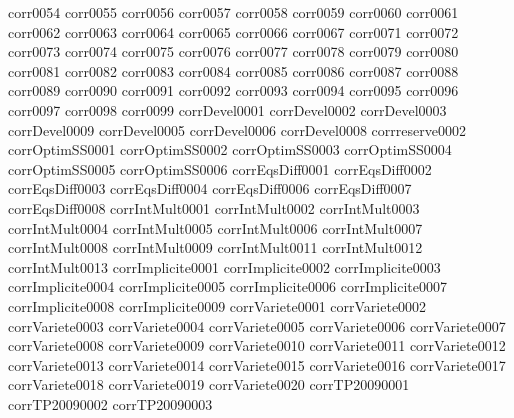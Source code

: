 {corr0054}
{corr0055}
{corr0056}
{corr0057}
{corr0058}
{corr0059}
{corr0060}
{corr0061}
{corr0062}
{corr0063}
{corr0064}
{corr0065}
{corr0066}
{corr0067}
{corr0071}
{corr0072}
{corr0073}
{corr0074}
{corr0075}
{corr0076}
{corr0077}
{corr0078}
{corr0079}
{corr0080}
{corr0081}
{corr0082}
{corr0083}
{corr0084}
{corr0085}
{corr0086}
{corr0087}
{corr0088}
{corr0089}
{corr0090}
{corr0091}
{corr0092}
{corr0093}
{corr0094}
{corr0095}
{corr0096}
{corr0097}
{corr0098}
{corr0099}
{corrDevel0001}
{corrDevel0002}
{corrDevel0003}
{corrDevel0009}
{corrDevel0005}
{corrDevel0006}
{corrDevel0008}
{corrreserve0002}
{corrOptimSS0001}
{corrOptimSS0002}
{corrOptimSS0003}
{corrOptimSS0004}
{corrOptimSS0005}
{corrOptimSS0006}
{corrEqsDiff0001}
{corrEqsDiff0002}
{corrEqsDiff0003}
{corrEqsDiff0004}
{corrEqsDiff0006}
{corrEqsDiff0007}
{corrEqsDiff0008}
{corrIntMult0001}
{corrIntMult0002}
{corrIntMult0003}
{corrIntMult0004}
{corrIntMult0005}
{corrIntMult0006}
{corrIntMult0007}
{corrIntMult0008}
{corrIntMult0009}
{corrIntMult0011}
{corrIntMult0012}
{corrIntMult0013}
{corrImplicite0001}
{corrImplicite0002}
{corrImplicite0003}
{corrImplicite0004}
{corrImplicite0005}
{corrImplicite0006}
{corrImplicite0007}
{corrImplicite0008}
{corrImplicite0009}
{corrVariete0001}
{corrVariete0002}
{corrVariete0003}
{corrVariete0004}
{corrVariete0005}
{corrVariete0006}
{corrVariete0007}
{corrVariete0008}
{corrVariete0009}
{corrVariete0010}
{corrVariete0011}
{corrVariete0012}
{corrVariete0013}
{corrVariete0014}
{corrVariete0015}
{corrVariete0016}
{corrVariete0017}
{corrVariete0018}
{corrVariete0019}
{corrVariete0020}
{corrTP20090001}
{corrTP20090002}
{corrTP20090003}
